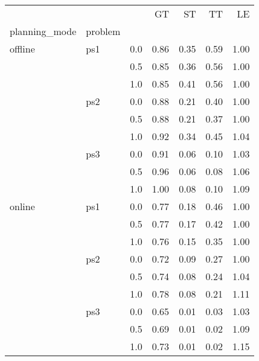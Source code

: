 \begin{tabular}{lllrrrr}
\toprule
       &     &     &   GT &   ST &   TT &   LE \\
planning\_mode & problem & {} &      &      &      &      \\
\midrule
offline & ps1 & 0.0 & 0.86 & 0.35 & 0.59 & 1.00 \\
       &     & 0.5 & 0.85 & 0.36 & 0.56 & 1.00 \\
       &     & 1.0 & 0.85 & 0.41 & 0.56 & 1.00 \\
       & ps2 & 0.0 & 0.88 & 0.21 & 0.40 & 1.00 \\
       &     & 0.5 & 0.88 & 0.21 & 0.37 & 1.00 \\
       &     & 1.0 & 0.92 & 0.34 & 0.45 & 1.04 \\
       & ps3 & 0.0 & 0.91 & 0.06 & 0.10 & 1.03 \\
       &     & 0.5 & 0.96 & 0.06 & 0.08 & 1.06 \\
       &     & 1.0 & 1.00 & 0.08 & 0.10 & 1.09 \\
online & ps1 & 0.0 & 0.77 & 0.18 & 0.46 & 1.00 \\
       &     & 0.5 & 0.77 & 0.17 & 0.42 & 1.00 \\
       &     & 1.0 & 0.76 & 0.15 & 0.35 & 1.00 \\
       & ps2 & 0.0 & 0.72 & 0.09 & 0.27 & 1.00 \\
       &     & 0.5 & 0.74 & 0.08 & 0.24 & 1.04 \\
       &     & 1.0 & 0.78 & 0.08 & 0.21 & 1.11 \\
       & ps3 & 0.0 & 0.65 & 0.01 & 0.03 & 1.03 \\
       &     & 0.5 & 0.69 & 0.01 & 0.02 & 1.09 \\
       &     & 1.0 & 0.73 & 0.01 & 0.02 & 1.15 \\
\bottomrule
\end{tabular}
